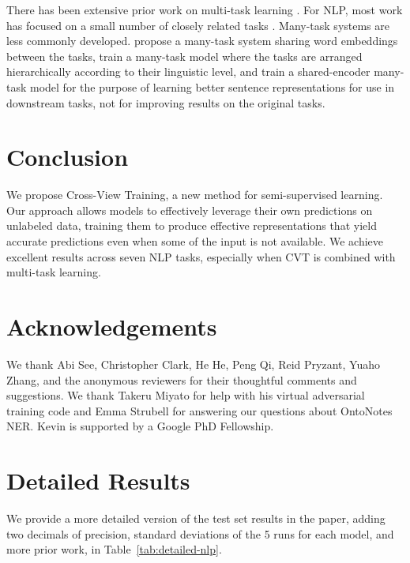 \documentclass[11pt,a4paper]{article}
\newcommand{\xhdr}[1]{\vspace{1.7mm}\noindent{{\bf #1.}}}
\begin{document}
\xhdr{Multi-Task Learning}
There has been extensive prior work on multi-task learning \citep{ Caruana1997MultitaskL, Ruder2017AnOO}.  
For NLP, most work has focused on a small number of closely related tasks \citep{Luong2015MultitaskST,zhang2016stack, Sgaard2016DeepML, Peng2017DeepML}. 
Many-task systems are less commonly developed. 
\citet{Collobert2008AUA} propose a many-task system sharing word embeddings between the tasks, 
\citet{hashimoto2016joint} train a many-task model where the tasks are arranged hierarchically according to their linguistic level, and  
\citet{subramanian2018learning} train a shared-encoder many-task model for the purpose of learning better sentence representations for use in downstream tasks, not for improving results on the original tasks. 


\section{Conclusion}
We propose Cross-View Training, a new method for semi-supervised learning.
Our approach allows models to effectively leverage their own predictions on unlabeled data, training them to produce effective representations that yield accurate predictions even when some of the input is not available. 
We achieve excellent results across seven NLP tasks, especially when CVT is combined with multi-task learning.

\section*{Acknowledgements}

We thank Abi See, Christopher Clark, He He, Peng Qi, Reid Pryzant, Yuaho Zhang,
and the anonymous reviewers for their thoughtful comments and suggestions.
We thank Takeru Miyato for help with his virtual adversarial training code and Emma Strubell for answering our questions about OntoNotes NER. 
Kevin is supported by a Google PhD Fellowship.




\appendix
\section{Detailed Results} We provide a more detailed version of the test set results in the paper, adding two decimals of precision, standard deviations of the 5 runs for each model, and more prior work, in Table~\ref{tab:detailed-nlp}.
\end{document}

